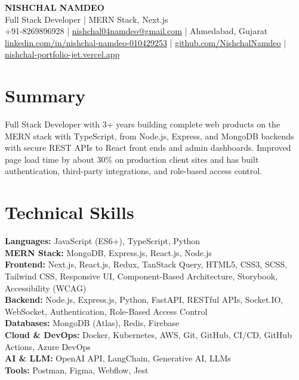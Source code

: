 \documentclass[a4paper,10pt]{article}
\begin{document}
\begin{center}
  {\LARGE \textbf{NISHCHAL NAMDEO}}\\[3pt]
  Full Stack Developer | MERN Stack, Next.js\\[3pt]
  +91-8269896928 | \href{mailto:nishchal04namdeo@gmail.com}{nishchal04namdeo@gmail.com} | Ahmedabad, Gujarat\\[2pt]
  \href{https://www.linkedin.com/in/nishchal-namdeo-010429253/}{linkedin.com/in/nishchal-namdeo-010429253} |
  \href{https://github.com/NishchalNamdeo}{github.com/NishchalNamdeo} |
  \href{https://nishchal-portfolio-jet.vercel.app/}{nishchal-portfolio-jet.vercel.app}
\end{center}

\section{Summary}
Full Stack Developer with 3+ years building complete web products on the MERN stack with TypeScript, from Node.js, Express, and MongoDB backends with secure REST APIs to React front ends and admin dashboards. Improved page load time by about 30\% on production client sites and has built authentication, third-party integrations, and role-based access control.

\section{Technical Skills}
\textbf{Languages:} JavaScript (ES6+), TypeScript, Python\\
\textbf{MERN Stack:} MongoDB, Express.js, React.js, Node.js\\
\textbf{Frontend:} Next.js, React.js, Redux, TanStack Query, HTML5, CSS3, SCSS, Tailwind CSS, Responsive UI, Component-Based Architecture, Storybook, Accessibility (WCAG)\\
\textbf{Backend:} Node.js, Express.js, Python, FastAPI, RESTful APIs, Socket.IO, WebSocket, Authentication, Role-Based Access Control\\
\textbf{Databases:} MongoDB (Atlas), Redis, Firebase\\
\textbf{Cloud \& DevOps:} Docker, Kubernetes, AWS, Git, GitHub, CI/CD, GitHub Actions, Azure DevOps\\
\textbf{AI \& LLM:} OpenAI API, LangChain, Generative AI, LLMs\\
\textbf{Tools:} Postman, Figma, Webflow, Jest
\end{document}
